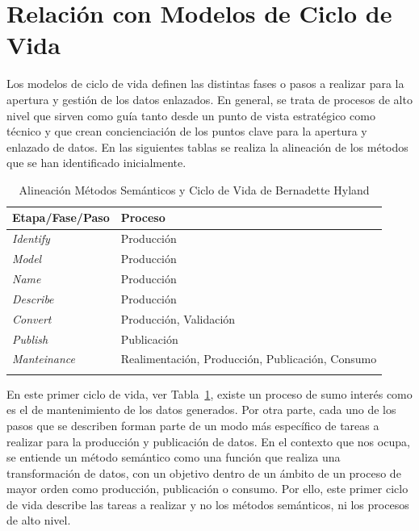 \section{Relación con Modelos de Ciclo de Vida}
Los modelos de ciclo de vida definen las distintas fases o pasos a realizar para la apertura
y gestión de los datos enlazados. En general, se trata de procesos de alto nivel que sirven como guía tanto desde un punto de vista
estratégico como técnico y que crean concienciación de los puntos clave para la apertura y enlazado de datos. En las siguientes
tablas se realiza la alineación de los métodos que se han identificado inicialmente.
\begin{longtable}[c]{|p{6cm}|p{8cm}|} 

\hline

  \textbf{Etapa/Fase/Paso} &  \textbf{Proceso} \\\hline

\endhead
\textit{Identify} & Producción \\ \hline
\textit{Model} & Producción \\ \hline
\textit{Name} & Producción \\ \hline
\textit{Describe} & Producción \\ \hline
\textit{Convert} & Producción, Validación \\ \hline
\textit{Publish} & Publicación \\ \hline
\textit{Manteinance} & Realimentación, Producción, Publicación, Consumo \\ \hline
\hline
\caption{Alineación Métodos Semánticos y Ciclo de Vida de Bernadette Hyland}  \label{tabla:metodos-hyland}\\    
\end{longtable}

En este primer ciclo de vida, ver Tabla~\ref{tabla:metodos-hyland}, existe un proceso de sumo interés como es el 
de mantenimiento de los datos generados. Por otra parte, cada uno de los pasos que se describen forman parte de un modo 
más específico de tareas a realizar para la producción y publicación de datos. En el contexto que nos ocupa, 
se entiende un método semántico como una función que realiza una transformación de datos, con un 
objetivo dentro de un ámbito de un proceso de mayor orden como producción, publicación o consumo. Por ello, este primer ciclo de vida describe las tareas a realizar y no los métodos semánticos, ni los procesos de alto nivel.

